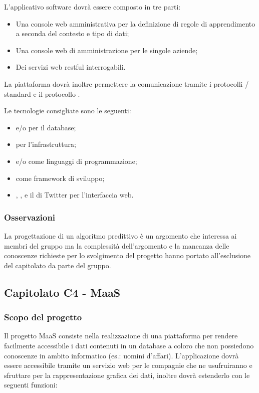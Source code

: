 L'applicativo software dovrà essere composto in tre parti:
\begin{itemize}
	\item Una console web amministrativa per la definizione di regole di apprendimento a seconda del contesto e tipo di dati;
	\item Una console web di amministrazione per le singole aziende;
	\item Dei servizi web restful  interrogabili.
\end{itemize}
La piattaforma dovrà inoltre permettere la comunicazione tramite i protocolli / standard e il protocollo .


Le tecnologie consigliate sono le seguenti:
\begin{itemize}
	\item {} e/o  per il database;
	\item {} per l'infrastruttura;
	\item {} e/o  come linguaggi di programmazione;
	\item {} come framework di sviluppo;
	\item {}, ,  e il  di Twitter per l'interfaccia web.
\end{itemize}

\subsubsection{Osservazioni}
La progettazione di un algoritmo predittivo è un argomento che interessa ai membri del gruppo ma la complessità dell'argomento e la mancanza delle conoscenze
richieste per lo svolgimento del progetto hanno portato all'esclusione del capitolato da parte del gruppo.



\subsection{Capitolato C4 - MaaS}
\subsubsection{Scopo del progetto}
Il progetto MaaS consiste nella realizzazione di una piattaforma per rendere facilmente accessibile i dati contenuti in un database a coloro che non possiedono conoscenze in ambito informatico (es.: uomini d'affari).
L'applicazione dovrà essere accessibile tramite un servizio web per le compagnie che ne usufruiranno e sfruttare  per la rappresentazione grafica dei dati, inoltre dovrà estenderlo con le seguenti funzioni:

